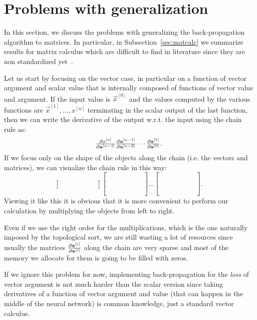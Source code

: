 \documentclass[pdflatex,sn-mathphys-num]{sn-jnl}%
\theoremstyle{thmstyleone}%
\theoremstyle{thmstyletwo}%
\theoremstyle{thmstylethree}%
\begin{document}
\section{Problems with generalization}\label{sec:generalization}

In this section, we discuss the problems with generalizing the back-propagation
algorithm to matrices. In particular, in Subsection~\ref{sec:matcalc} we
summarize results for matrix calculus which are difficult to find in literature
since they are non standardized yet~\cite{magnus2010}.

\begingroup
\newcommand{\bb}{\phantom{12}}
\renewcommand\matrix{\left[\begin{array}{ccc}\bb&\bb&\bb\\\bb&\bb&\bb\\\bb&\bb&\bb\end{array}\right]}
\renewcommand\vector{\left[\begin{array}{ccc}\bb&\bb&\bb\end{array}\right]}

Let us start by focusing on the vector case, in particular on a function of
vector argument and scalar value that is internally composed of functions of
vector value and argument.  If the input value is \(\vec x^{[0]}\) and the
values computed by the various functions are \(\vec x^{[1]}, \ldots, x^{[n]}\)
terminating in the scalar output of the last function, then we can write the
derivative of the output w.r.t. the input using the chain rule as:
\[\textstyle\frac{\partial x^{[n]}}{\partial\mathbf{x}^{[n-1]}} \textstyle\frac{\partial\mathbf{x}^{[n-1]}}{\partial\mathbf{x}^{[n-2]}} \cdots \textstyle\frac{\partial\mathbf{x}^{[1]}}{\partial\mathbf{x}^{[0]}}.\] If we focus only
on the shape of the objects along the chain (i.e. the vectors and matrices), we
can visualize the chain rule in this way: \[\vector \matrix \dots \matrix\!\!.\]
Viewing it like this it is obvious that it is more convenient to perform our
calculation by multiplying the objects from left to right.
\endgroup

Even if we use the right order for the multiplications, which is the one
naturally imposed by the topological sort, we are still wasting a lot of
resources since usually the matrices \(\textstyle\frac{\partial\mathbf{x}^{[j]}}{\partial\mathbf{x}^{[i]}}\) along the chain are very sparse and most of the memory we allocate
for them is going to be filled with zeros.

If we ignore this problem for now, implementing back-propagation for the
\emph{loss} of vector argument is not much harder than the scalar version since
taking derivatives of a function of vector argument and value (that can happen
in the middle of the neural network) is common knowledge, just a standard vector
calculus.
\end{document}
